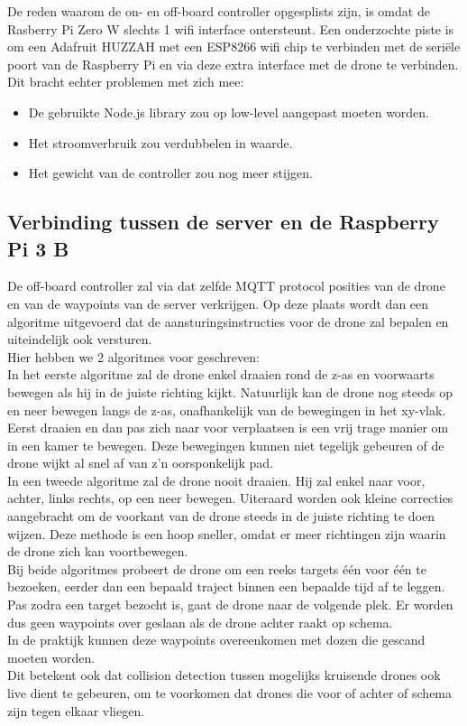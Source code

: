 De reden waarom de on- en off-board controller opgesplists zijn, is omdat de Rasberry Pi Zero W slechts 1 wifi interface ontersteunt.
Een onderzochte piste is om een Adafruit HUZZAH met een ESP8266 wifi chip te verbinden met de seri\"ele poort van de Raspberry Pi en via deze extra interface met de drone te verbinden.\\
Dit bracht echter problemen met zich mee:
\begin{itemize}
	\item De gebruikte Node.js library zou op low-level aangepast moeten worden.
	\item Het stroomverbruik zou verdubbelen in waarde.
	\item Het gewicht van de controller zou nog meer stijgen.
\end{itemize}

\subsection{Verbinding tussen de server en de Raspberry Pi 3 B} \label{sec:server_raspberry}
De off-board controller zal via dat zelfde MQTT protocol posities van de drone en van de waypoints van de server verkrijgen.
Op deze plaats wordt dan een algoritme uitgevoerd dat de aansturingsinstructies voor de drone zal bepalen en uiteindelijk ook versturen.\\

Hier hebben we 2 algoritmes voor geschreven:\\
In het eerste algoritme zal de drone enkel draaien rond de z-as en voorwaarts bewegen als hij in de juiste richting kijkt.
Natuurlijk kan de drone nog steeds op en neer bewegen langs de z-as, onafhankelijk van de bewegingen in het xy-vlak.
Eerst draaien en dan pas zich naar voor verplaatsen is een vrij trage manier om in een kamer te bewegen.
Deze bewegingen kunnen niet tegelijk gebeuren of de drone wijkt al snel af van z'n oorsponkelijk pad.\\
In een tweede algoritme zal de drone nooit draaien.
Hij zal enkel naar voor, achter, links rechts, op een neer bewegen.
Uiteraard worden ook kleine correcties aangebracht om de voorkant van de drone steeds in de juiste richting te doen wijzen.
Deze methode is een hoop sneller, omdat er meer richtingen zijn waarin de drone zich kan voortbewegen.\\

Bij beide algoritmes probeert de drone om een reeks targets \'e\'en voor \'e\'en te bezoeken, eerder dan een bepaald traject binnen een bepaalde tijd af te leggen.
Pas zodra een target bezocht is, gaat de drone naar de volgende plek.
Er worden dus geen waypoints over geslaan als de drone achter raakt op schema.\\
In de praktijk kunnen deze waypoints overeenkomen met dozen die gescand moeten worden.\\
Dit betekent ook dat collision detection tussen mogelijks kruisende drones ook live dient te gebeuren, om te voorkomen dat drones die voor of achter of schema zijn tegen elkaar vliegen.

